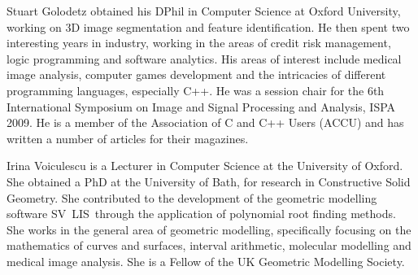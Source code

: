 \documentclass[10pt,twocolumn,twoside]{IEEEtran}
\newcommand{\svlis}{%
\mbox{\scriptsize S\hspace{-0.2mm}\footnotesize V\hspace{-0.2mm}%
\normalsize L\hspace{0.1mm}\footnotesize I\hspace{0.2mm}\scriptsize S\ }}
\begin{document}
\begin{IEEEbiography}{Stuart Golodetz}
obtained his DPhil in Computer Science at Oxford University, working on 3D image segmentation and feature identification. He then spent two interesting years in industry, working in the areas of credit risk management, logic programming and software analytics. His areas of interest include medical image analysis, computer games development and the intricacies of different programming languages, especially C++. He was a session chair for the 6th International Symposium on Image and Signal Processing and Analysis, ISPA 2009. He is a member of the Association of C and C++ Users (ACCU) and has written a number of articles for their magazines.
\end{IEEEbiography}

\begin{IEEEbiography}{Irina Voiculescu}
is a Lecturer in Computer Science at the University of Oxford. She obtained a PhD at the University of Bath, for research in Constructive Solid Geometry. She contributed to the development of the geometric modelling software \svlis through the application of polynomial root finding methods. She works in the general area of geometric modelling, specifically focusing on the mathematics of curves and surfaces, interval arithmetic, molecular modelling and medical image analysis. She is a Fellow of the UK Geometric Modelling Society.
\end{IEEEbiography}
\end{document}
